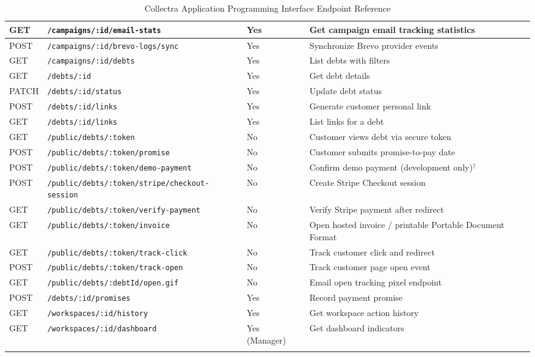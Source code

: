 \documentclass[12pt,a4paper]{report}
\begin{document}
{\begin{longtable}{|p{1.2cm}|p{4.95cm}|p{2.25cm}|p{5.05cm}|}
  \hline
  GET   & \texttt{/campaigns/:id/email-stats}        & Yes            & Get campaign email tracking statistics \\
  \hline
  POST  & \texttt{/campaigns/:id/brevo-logs/sync}    & Yes            & Synchronize Brevo provider events \\
  \hline
  GET   & \texttt{/campaigns/:id/debts}              & Yes            & List debts with filters \\
  \hline
  GET   & \texttt{/debts/:id}                        & Yes            & Get debt details \\
  \hline
  PATCH & \texttt{/debts/:id/status}                 & Yes            & Update debt status \\
  \hline
  POST  & \texttt{/debts/:id/links}                  & Yes            & Generate customer personal link \\
  \hline
  GET   & \texttt{/debts/:id/links}                  & Yes            & List links for a debt \\
  \hline
  GET   & \texttt{/public/debts/:token}              & No             & Customer views debt via secure token \\
  \hline
  POST  & \texttt{/public/debts/:token/promise}      & No             & Customer submits promise-to-pay date \\
  \hline
  POST  & \texttt{/public/debts/:token/demo-payment} & No             & Confirm demo payment (development only)$^{\dagger}$ \\
  \hline
  POST  & \texttt{/public/debts/:token/stripe/checkout-session} & No & Create Stripe Checkout session \\
  \hline
  GET   & \texttt{/public/debts/:token/verify-payment} & No           & Verify Stripe payment after redirect \\
  \hline
  GET   & \texttt{/public/debts/:token/invoice}      & No             & Open hosted invoice / printable Portable Document Format \\
  \hline
  GET   & \texttt{/public/debts/:token/track-click}  & No             & Track customer click and redirect \\
  \hline
  POST  & \texttt{/public/debts/:token/track-open}   & No             & Track customer page open event \\
  \hline
  GET   & \texttt{/public/debts/:debtId/open.gif}    & No             & Email open tracking pixel endpoint \\
  \hline
  POST  & \texttt{/debts/:id/promises}               & Yes            & Record payment promise \\
  \hline
  GET   & \texttt{/workspaces/:id/history}           & Yes            & Get workspace action history \\
  \hline
  GET   & \texttt{/workspaces/:id/dashboard}         & Yes (Manager)  & Get dashboard indicators \\
  \hline
  \caption{Collectra Application Programming Interface Endpoint Reference}
  \label{tab:api-endpoints}
\end{longtable}
}
\end{document}
